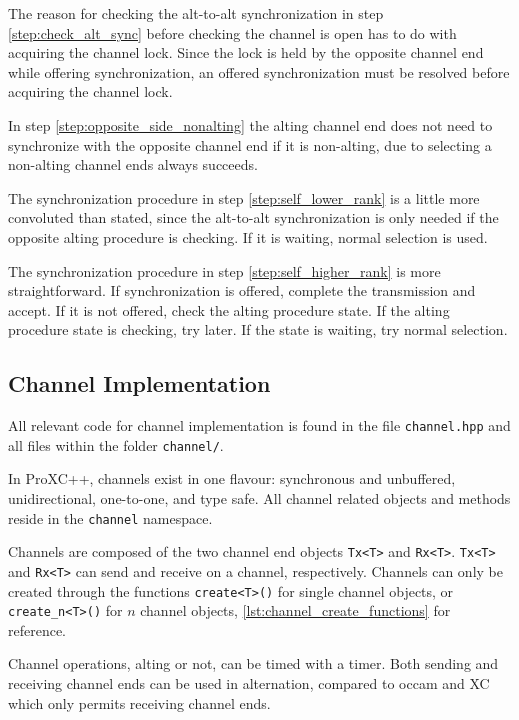 The reason for checking the alt\hyp{}to\hyp{}alt synchronization in step \ref{step:check_alt_sync} before checking the channel is open has to do with acquiring the channel lock. Since the lock is held by the opposite channel end while offering synchronization, an offered synchronization must be resolved before acquiring the channel lock.

In step \ref{step:opposite_side_nonalting} the alting channel end does not need to synchronize with the opposite channel end if it is non\hyp{}alting, due to selecting a non\hyp{}alting channel ends always succeeds. 

The synchronization procedure in step \ref{step:self_lower_rank} is a little more convoluted than stated, since the alt\hyp{}to\hyp{}alt synchronization is only needed if the opposite alting procedure is checking. If it is waiting, normal selection is used.

The synchronization procedure in step \ref{step:self_higher_rank} is more straightforward. If synchronization is offered, complete the transmission and accept. If it is not offered, check the alting procedure state. If the alting procedure state is checking, try later. If the state is waiting, try normal selection. 


\FloatBarrier
\subsection{Channel Implementation}
\label{subsec:channel_implementation}

All relevant code for channel implementation is found in the file \texttt{channel.hpp} and all files within the folder \texttt{channel/}.

In ProXC++, channels exist in one flavour: synchronous and unbuffered, unidirectional, one\hyp{}to\hyp{}one, and type safe. All channel related objects and methods reside in the \texttt{channel} namespace.

Channels are composed of the two channel end objects \texttt{Tx<T>} and \texttt{Rx<T>}. \texttt{Tx<T>} and \texttt{Rx<T>} can send and receive on a channel, respectively. Channels can only be created through the functions \texttt{create<T>()} for single channel objects, or \texttt{create\_n<T>()} for $n$ channel objects, \cref{lst:channel_create_functions} for reference. 

Channel operations, alting or not, can be timed with a timer. Both sending and receiving channel ends can be used in alternation, compared to occam and XC which only permits receiving channel ends.

